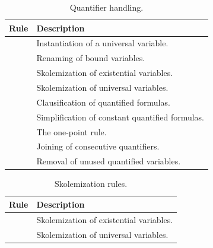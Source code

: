 \begin{xltabular}{\linewidth}{l X}
\caption{Quantifier handling.}
\label{rule-tab:quants}\\
	Rule & Description \\
	\hline
{} & Instantiation of a universal variable. \\
 & Renaming of bound variables. \\
 & Skolemization of existential variables. \\
 & Skolemization of universal variables. \\
 & Clausification of quantified formulas. \\
 & Simplification of constant quantified formulas. \\
 & The one-point rule. \\
 & Joining of consecutive quantifiers. \\
 & Removal of unused quantified variables. \\
\end{xltabular}

\begin{xltabular}{\linewidth}{l X}
\caption{Skolemization rules.}
\label{rule-tab:skos}\\
	Rule & Description \\
	\hline
{} & Skolemization of existential variables. \\
 & Skolemization of universal variables. \\
\end{xltabular}

